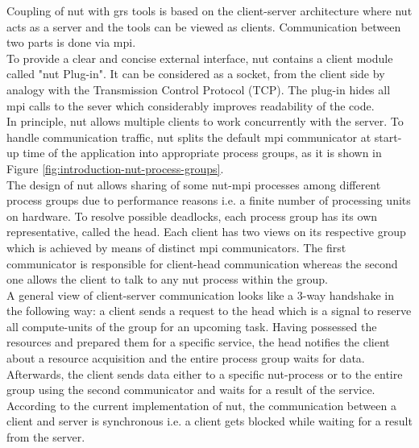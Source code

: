 Coupling of \acrshort{nut} with \acrshort{grs} tools is based on the client-server architecture where \acrshort{nut} acts as a server and the tools can be viewed as clients. Communication between two parts is done via \acrshort{mpi}.\\


To provide a clear and concise external interface, \acrshort{nut} contains a client module called "\acrshort{nut} Plug-in". It can be  considered as a socket, from the client side by analogy with the Transmission Control Protocol (TCP). The plug-in hides all \acrshort{mpi} calls to the sever which considerably improves readability of the code.\\


In principle, \acrshort{nut} allows multiple clients to work concurrently with the server. To handle communication traffic, \acrshort{nut} splits the default \acrshort{mpi} communicator at start-up time of the application into appropriate process groups, as it is shown in Figure \ref{fig:introduction-nut-process-groups}.\\



The design of \acrshort{nut} allows sharing of some \acrshort{nut}-\acrshort{mpi} processes among different process groups due to performance reasons i.e. a finite number of processing units on hardware. To resolve possible deadlocks, each process group has its own representative, called the head. Each client has two views on its respective group which is achieved by means of distinct \acrshort{mpi} communicators. The first communicator is responsible for client-head communication whereas the second one allows the client to talk to any \acrshort{nut} process within the group.\\



A general view of client-server communication looks like a 3-way handshake in the following way: a client sends a request to the head which is a signal to reserve all compute-units of the group for an upcoming task. Having possessed the resources and prepared them for a specific service, the head notifies the client about a resource acquisition and the entire process group waits for data. Afterwards, the client sends data either to a specific \acrshort{nut}-process or to the entire group using the second communicator and waits for a result of the service. According to the current implementation of \acrshort{nut}, the communication between a client and server is synchronous i.e. a client gets blocked while waiting for a result from the server. \\



